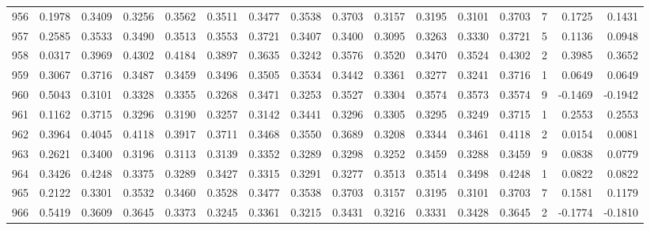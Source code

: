 \begin{tabular}{lrrrrrrrrrrrrrrr}
956 &      0.1978 &  0.3409 &  0.3256 &  0.3562 &  0.3511 &  0.3477 &  0.3538 &  0.3703 &  0.3157 &  0.3195 &   0.3101 &     0.3703 &      7 &                    0.1725 &                     0.1431 \\
957 &      0.2585 &  0.3533 &  0.3490 &  0.3513 &  0.3553 &  0.3721 &  0.3407 &  0.3400 &  0.3095 &  0.3263 &   0.3330 &     0.3721 &      5 &                    0.1136 &                     0.0948 \\
958 &      0.0317 &  0.3969 &  0.4302 &  0.4184 &  0.3897 &  0.3635 &  0.3242 &  0.3576 &  0.3520 &  0.3470 &   0.3524 &     0.4302 &      2 &                    0.3985 &                     0.3652 \\
959 &      0.3067 &  0.3716 &  0.3487 &  0.3459 &  0.3496 &  0.3505 &  0.3534 &  0.3442 &  0.3361 &  0.3277 &   0.3241 &     0.3716 &      1 &                    0.0649 &                     0.0649 \\
960 &      0.5043 &  0.3101 &  0.3328 &  0.3355 &  0.3268 &  0.3471 &  0.3253 &  0.3527 &  0.3304 &  0.3574 &   0.3573 &     0.3574 &      9 &                   -0.1469 &                    -0.1942 \\
961 &      0.1162 &  0.3715 &  0.3296 &  0.3190 &  0.3257 &  0.3142 &  0.3441 &  0.3296 &  0.3305 &  0.3295 &   0.3249 &     0.3715 &      1 &                    0.2553 &                     0.2553 \\
962 &      0.3964 &  0.4045 &  0.4118 &  0.3917 &  0.3711 &  0.3468 &  0.3550 &  0.3689 &  0.3208 &  0.3344 &   0.3461 &     0.4118 &      2 &                    0.0154 &                     0.0081 \\
963 &      0.2621 &  0.3400 &  0.3196 &  0.3113 &  0.3139 &  0.3352 &  0.3289 &  0.3298 &  0.3252 &  0.3459 &   0.3288 &     0.3459 &      9 &                    0.0838 &                     0.0779 \\
964 &      0.3426 &  0.4248 &  0.3375 &  0.3289 &  0.3427 &  0.3315 &  0.3291 &  0.3277 &  0.3513 &  0.3514 &   0.3498 &     0.4248 &      1 &                    0.0822 &                     0.0822 \\
965 &      0.2122 &  0.3301 &  0.3532 &  0.3460 &  0.3528 &  0.3477 &  0.3538 &  0.3703 &  0.3157 &  0.3195 &   0.3101 &     0.3703 &      7 &                    0.1581 &                     0.1179 \\
966 &      0.5419 &  0.3609 &  0.3645 &  0.3373 &  0.3245 &  0.3361 &  0.3215 &  0.3431 &  0.3216 &  0.3331 &   0.3428 &     0.3645 &      2 &                   -0.1774 &                    -0.1810 \\

\end{tabular}
